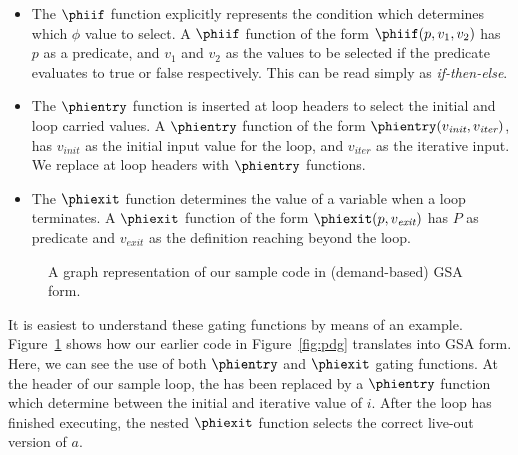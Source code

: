 \begin{itemize}
\item The $\phiif$ function explicitly represents the condition which determines which $\phi$ value to select. 
  A $\phiif$ function of the form $\phiif(p,v_{1},v_{2})$ has $p$ as a predicate, and $v_{1}$ and $v_{2}$ as the values to be selected if the predicate evaluates to true or false respectively. 
  This can be read simply as \textit{if-then-else}.
\item The $\phientry$ function is inserted at loop headers to select the initial and loop carried values. A $\phientry$ function of the form $\phientry(v_\textit{init},v_\textit{iter})$, has $v_\textit{init}$ as the initial input value for the loop, and $v_\textit{iter}$ as the iterative input. We replace \phifuns at loop headers with $\phientry$ functions.
\item The $\phiexit$ function determines the value of a variable when a loop terminates. 
  A $\phiexit$ function of the form $\phiexit(p,v_\textit{exit})$ has $P$ as predicate and $v_\textit{exit}$ as the definition reaching beyond the loop.
\end{itemize}

\begin{figure}
\centering
{}
\caption{A graph representation of our sample code in (demand-based) GSA form.}
\label{fig:gsa-graph-example}
\end{figure}

It is easiest to understand these gating functions by means of an example. 
Figure~\ref{fig:gsa-graph-example} shows how our earlier code in Figure~\ref{fig:pdg} translates into GSA form. 
Here, we can see the use of both $\phientry$ and $\phiexit$ gating functions. 
At the header of our sample loop, the \phifun has been replaced by a $\phientry$ function which determine between the initial and iterative value of $i$. 
After the loop has finished executing, the nested $\phiexit$ function selects the correct live-out version of $a$.

